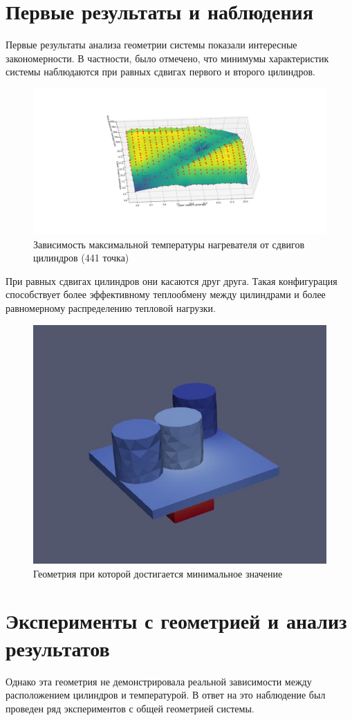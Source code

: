 \documentclass[a4paper,12pt]{article}
\theoremstyle{plain} %
\theoremstyle{definition} %
\theoremstyle{remark} %
\begin{document}
\section{Первые результаты и наблюдения}

Первые результаты анализа геометрии системы показали интересные закономерности. В частности, было отмечено, что минимумы характеристик системы наблюдаются при равных сдвигах первого и второго цилиндров.

\begin{figure}[h]
	\begin{center}
		\includegraphics[width=0.4\linewidth]{18.3.jpg}
		\caption{Зависимость максимальной температуры нагревателя от сдвигов цилиндров (441 точка)} %
	\end{center}
\end{figure}

При равных сдвигах цилиндров они касаются друг друга. Такая конфигурация способствует более эффективному теплообмену между цилиндрами и более равномерному распределению тепловой нагрузки.

\begin{figure}[h]
	\begin{center}
		\includegraphics[width=0.4\linewidth]{19.jpg}
		\caption{Геометрия при которой достигается минимальное значение} %
	\end{center}
\end{figure}

\section{Эксперименты с геометрией и анализ результатов}

Однако эта геометрия не демонстрировала реальной зависимости между расположением цилиндров и температурой. В ответ на это наблюдение был проведен ряд экспериментов с общей геометрией системы.
\end{document}
